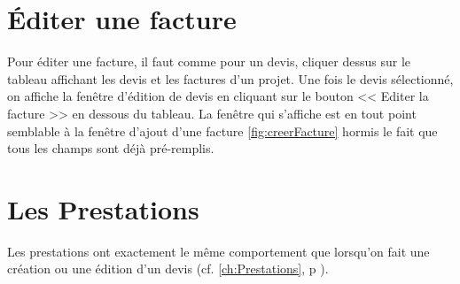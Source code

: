 \section{Éditer une facture}
Pour éditer une facture, il faut comme pour un devis, cliquer dessus sur le tableau affichant les devis et les factures d'un projet. Une fois le devis sélectionné, on affiche la fenêtre d'édition de devis en cliquant sur le bouton << Editer la facture >> en dessous du tableau.
La fenêtre qui s'affiche est en tout point semblable à la fenêtre d'ajout d'une facture \ref{fig:creerFacture} hormis le fait que tous les champs sont déjà pré-remplis.
\section{Les Prestations}
Les prestations ont exactement le même comportement que lorsqu'on fait une création ou une édition d'un devis (cf. \ref{ch:Prestations}, p \pageref{ch:Prestations}).